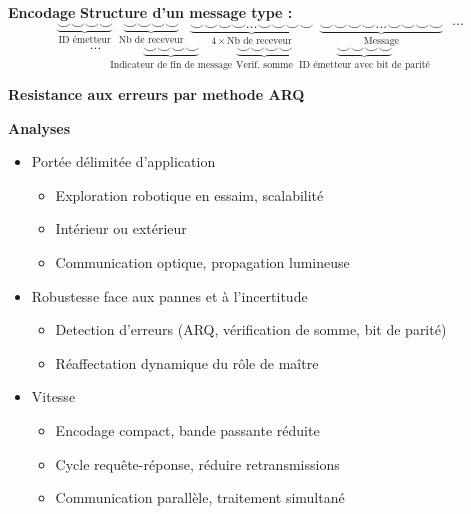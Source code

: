 \documentclass[aspectratio=169,10pt]{beamer}
\begin{document}
\begin{frame}{\textbf{Encodage}}
	\textbf{Structure d'un message type :}
	$$
	\underbrace{\smallsmile \smallsmile \smallsmile \smallsmile}_{\text{ID émetteur}}~~
	\underbrace{\smallsmile \smallsmile \smallsmile \smallsmile}_{\text{Nb de receveur}}~~
	\underbrace{\smallsmile \smallsmile \smallsmile \smallsmile \dots \smallsmile \smallsmile \smallsmile \smallsmile}_{4 \times \text{Nb de receveur}}~~
	\underbrace{\smallsmile \smallsmile \smallsmile \smallsmile \dots \smallsmile \smallsmile \smallsmile \smallsmile}_{\text{Message}}
	~~~ \cdots
	$$
	\vspace{0.3em}
	$$
	\cdots ~~~
	\underbrace{\smallsmile \smallsmile \smallsmile \smallsmile}_{\text{Indicateur de fin de message}}\;
	\underbrace{\smallsmile \smallsmile \smallsmile \smallsmile}_{\text{Verif. somme}}~~
	\underbrace{\smallsmile \smallsmile \smallsmile \smallsmile}_{\text{ID émetteur avec bit de parité}}
	$$

	\textbf{Resistance aux erreurs par methode ARQ}
\end{frame}


\begin{frame}{\textbf{Analyses}}
	\begin{itemize}
		\item{Portée délimitée d'application}
		\begin{itemize}
			\item Exploration robotique en essaim, scalabilité
			\item Intérieur ou extérieur
			\item Communication optique, propagation lumineuse
		\end{itemize}
		
		\vspace{0.2cm}
		\item{Robustesse face aux pannes et à l'incertitude}
		\begin{itemize}
			\item Detection d'erreurs (ARQ, vérification de somme, bit de parité)
			\item Réaffectation dynamique du rôle de maître
		\end{itemize}
		
		\vspace{0.2cm}
		\item{Vitesse}
		\begin{itemize}
			\item Encodage compact, bande passante réduite
			\item Cycle requête-réponse, réduire retransmissions
			\item Communication parallèle, traitement simultané
		\end{itemize}
	\end{itemize}
\end{frame}
\end{document}

